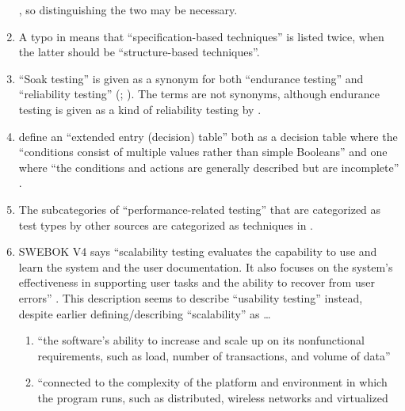 \begin{enumerate}
            \citep[p.~107]{BaresiAndPezzè2006}, so distinguishing the two
            may be necessary.
      \item A typo in \citep[Fig.~2]{IEEE2021} means that ``specification-based
            techniques'' is listed twice, when the latter should be
            ``structure-based techniques''.
      \item ``Soak testing'' is given as a synonym for both ``endurance testing''
            \citep[p.~39]{IEEE2021} and ``reliability testing''
            (\citealp[Tab.~2]{Gerrard2000a}; \citeyear[Tab.~1, p.~26]{Gerrard2000b}).
            The terms are not synonyms, although endurance testing is given
            as a kind of reliability testing by \citet[p.~55]{Firesmith2015}.
      \item \citeauthor{IEEE2021} define an ``extended entry (decision) table''
            both as a decision table where the ``conditions consist of multiple
            values rather than simple Booleans'' \citeyearpar[p.~18]{IEEE2021}
            and one where ``the conditions and actions are generally described
            but are incomplete'' \citeyearpar[p.~175]{IEEE2017} .
      \item The subcategories of ``performance-related testing'' that are
            categorized as test types by other sources \citep{IEEE2022, IEEE2017,
                  IEEE2013} are categorized as techniques in
            \citeyearpar[p.~39]{IEEE2021}.
      \item SWEBOK V4 says ``scalability testing evaluates the capability to
            use and learn the system and the user documentation. It also focuses
            on the system's effectiveness in supporting user tasks and the
            ability to recover from user errors'' \citep[p.~5-9]{SWEBOK2024}.
            This description seems to describe ``usability testing'' instead,
            despite earlier defining/describing ``scalability'' as \ldots
            \begin{enumerate}
                  \item ``the software's ability to increase and scale up on its
                        nonfunctional requirements, such as load, number of
                        transactions, and volume of data'' \citep[p.~5-5]{SWEBOK2024}
                  \item ``connected to the complexity of the platform and
                        environment in which the program runs, such as
                        distributed, wireless networks and virtualized

\end{enumerate}
\end{enumerate}
